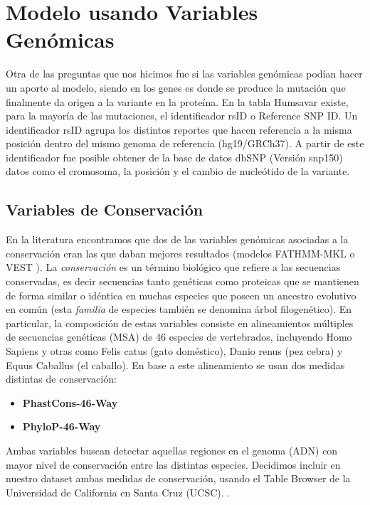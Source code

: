 \newpage

\section{Modelo usando Variables Genómicas}

Otra de las preguntas que nos hicimos fue si las variables genómicas podían hacer un aporte al modelo, siendo en los genes es donde se produce la mutación que finalmente da origen a la variante en la proteína. En la tabla Humsavar existe, para la mayoría de las mutaciones, el identificador rsID o Reference SNP ID. Un identificador rsID agrupa los distintos reportes que hacen referencia a la misma posición dentro del mismo genoma de referencia (hg19/GRCh37). A partir de este identificador fue posible obtener de la base de datos dbSNP (Versión snp150) datos como el cromosoma, la posición y el cambio de nucleótido de la variante. 

\subsection{Variables de Conservación}

En la literatura encontramos que dos de las variables genómicas asociadas a la conservación eran las que daban mejores resultados (modelos FATHMM-MKL \cite{Shihab2015} o VEST \cite{Carter2013}). La \textit{conservación} es un término biológico que refiere a las secuencias conservadas, es decir secuencias tanto genéticas como proteicas que se mantienen de forma similar o idéntica en muchas especies que poseen un ancestro evolutivo en común (esta \textit{familia} de especies también se denomina árbol filogenético). En particular, la composición de estas variables consiste en alineamientos múltiples de secuencias genéticas (MSA) de 46 especies de vertebrados, incluyendo Homo Sapiens y otras como Felis catus (gato doméstico), Danio renus (pez cebra) y Equus Caballus (el caballo). En base a este alineamiento se usan dos medidas distintas de conservación:
\begin{itemize}
    \item \textbf{PhastCons-46-Way} \cite{siepel2005evolutionarily}
    \item \textbf{PhyloP-46-Way} \cite{Pollard2010}
\end{itemize}
Ambas variables buscan detectar aquellas regiones en el genoma (ADN) con mayor nivel de conservación entre las distintas especies. Decidimos incluir en nuestro dataset ambas medidas de conservación, usando el Table Browser de la Universidad de California en Santa Cruz (UCSC). \cite{Karolchik2004}.

